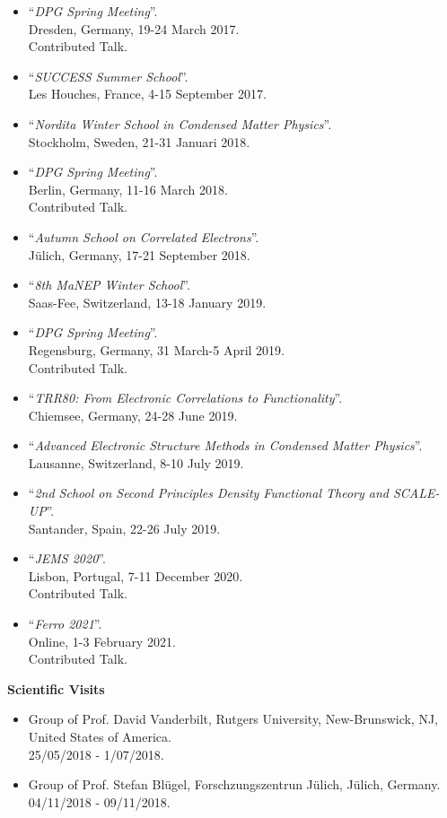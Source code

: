 \documentclass[10pt, a4paper]{article}
\begin{document}
\begin{itemize}
\item
``\textit{DPG Spring Meeting}''.\\
Dresden, Germany, 19-24 March 2017.\\
Contributed Talk.
\item
``\textit{SUCCESS Summer School}''.\\
Les Houches, France, 4-15 September 2017.
\item
``\textit{Nordita Winter School in Condensed Matter Physics}''.\\
Stockholm, Sweden, 21-31 Januari 2018.
\item 
``\textit{DPG Spring Meeting}''.\\
Berlin, Germany, 11-16 March 2018.\\
Contributed Talk.
\item
``\textit{Autumn School on Correlated Electrons}''. \\
J\"ulich, Germany, 17-21 September 2018.
\item
``\textit{8th MaNEP Winter School}''.\\
 Saas-Fee, Switzerland, 13-18 January 2019.
\item 
``\textit{DPG Spring Meeting}''.\\
Regensburg, Germany, 31 March-5 April 2019.\\
Contributed Talk.
\item
``\textit{TRR80: From Electronic Correlations to Functionality}''.\\
 Chiemsee, Germany, 24-28 June 2019.
\item
``\textit{Advanced Electronic Structure Methods in Condensed Matter Physics}''.\\
 Lausanne, Switzerland, 8-10 July 2019.
\item
``\textit{2nd School on Second Principles Density Functional Theory and SCALE-UP}''.\\
 Santander, Spain, 22-26 July 2019.
\item
``\textit{JEMS 2020}''.\\
 Lisbon, Portugal, 7-11 December 2020.\\
 Contributed Talk.
 \\
\item
``\textit{Ferro 2021}''.\\
 Online, 1-3 February 2021.\\
 Contributed Talk.
 \\

\end{itemize}
\vspace{0.4cm}
{\bf Scientific Visits}
\begin{itemize}
 \item
 Group of Prof. David Vanderbilt, Rutgers University, New-Brunswick, NJ, United States of America. \\
 25/05/2018 - 1/07/2018.
 \item
 Group of Prof. Stefan Bl\"ugel, Forschzungszentrun J\"ulich, J\"ulich, Germany.\\
 04/11/2018 - 09/11/2018.
\end{itemize}
\vspace{0.4cm}
\end{document}
